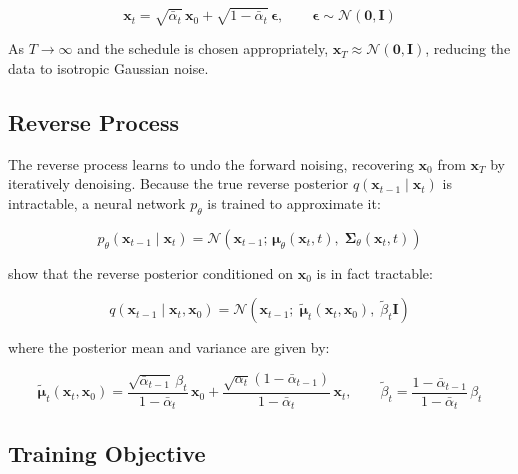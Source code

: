 \documentclass{article}
\begin{document}
\begin{equation}
    \mathbf{x}_t = \sqrt{\bar{\alpha}_t}\,\mathbf{x}_0 +
    \sqrt{1 - \bar{\alpha}_t}\,\boldsymbol{\epsilon}, \qquad
    \boldsymbol{\epsilon} \sim \mathcal{N}(\mathbf{0}, \mathbf{I})
\end{equation}

\noindent As $T \to \infty$ and the schedule is chosen appropriately,
$\mathbf{x}_T \approx \mathcal{N}(\mathbf{0}, \mathbf{I})$, reducing the data to
isotropic Gaussian noise.

\subsection{Reverse Process}

The reverse process learns to undo the forward noising, recovering $\mathbf{x}_0$ from
$\mathbf{x}_T$ by iteratively denoising. Because the true reverse posterior
$q(\mathbf{x}_{t-1} \mid \mathbf{x}_t)$ is intractable, a neural network
$p_\theta$ is trained to approximate it:

\begin{equation}
    p_\theta(\mathbf{x}_{t-1} \mid \mathbf{x}_t) = \mathcal{N}\!\left(\mathbf{x}_{t-1};\,
    \boldsymbol{\mu}_\theta(\mathbf{x}_t, t),\;
    \boldsymbol{\Sigma}_\theta(\mathbf{x}_t, t)\right)
\end{equation}

\noindent \citet{ho2020denoising} show that the reverse posterior conditioned on
$\mathbf{x}_0$ is in fact tractable:

\begin{equation}
    q(\mathbf{x}_{t-1} \mid \mathbf{x}_t, \mathbf{x}_0) = \mathcal{N}\!\left(
    \mathbf{x}_{t-1};\; \tilde{\boldsymbol{\mu}}_t(\mathbf{x}_t, \mathbf{x}_0),\;
    \tilde{\beta}_t \mathbf{I}\right)
\end{equation}

\noindent where the posterior mean and variance are given by:

\begin{equation}
    \tilde{\boldsymbol{\mu}}_t(\mathbf{x}_t, \mathbf{x}_0) =
    \frac{\sqrt{\bar{\alpha}_{t-1}}\,\beta_t}{1 - \bar{\alpha}_t}\,\mathbf{x}_0
    + \frac{\sqrt{\alpha_t}(1 - \bar{\alpha}_{t-1})}{1 - \bar{\alpha}_t}\,\mathbf{x}_t,
    \qquad
    \tilde{\beta}_t = \frac{1 - \bar{\alpha}_{t-1}}{1 - \bar{\alpha}_t}\,\beta_t
\end{equation}

\subsection{Training Objective}
\end{document}
